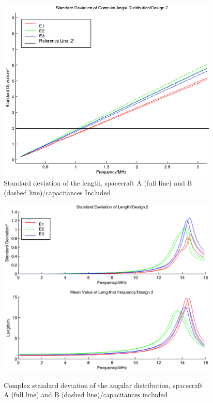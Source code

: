 \documentclass[a4paper,14pt]{extbook}
\begin{document}
\begin{figure}
\begin{center}
\includegraphics[width=12cm]{VirtualSigma1D2_caps.eps}\\
\caption{Standard deviation of the length, spacecraft A (full line) and B (dashed line)/capacitances Included} \label{fig_VirtualSigma1_D2_caps}
\includegraphics[width=12cm]{VirtualSigma2D2_caps.eps} \\
\caption{Complex standard deviation of the angular distribution, spacecraft A (full line) and B (dashed line)/capacitances included} \label{fig_VirtualSigma2_D2_caps}
\end{center}
\end{figure}
\end{document}
